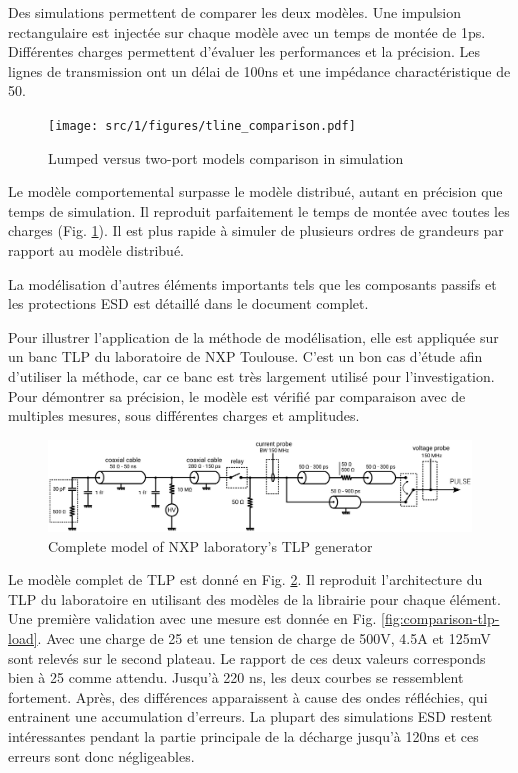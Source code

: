 Des simulations permettent de comparer les deux modèles.
Une impulsion rectangulaire est injectée sur chaque modèle avec un temps de montée de 1ps.
Différentes charges permettent d'évaluer les performances et la précision.
Les lignes de transmission ont un délai de 100ns et une impédance charactéristique de 50\textOmega{}.

\begin{figure}[!h]
  \centering
  \texttt{[image: src/1/figures/tline\_comparison.pdf]}
  \caption{Lumped versus two-port models comparison in simulation}
  \label{fig:lines-simulations}
\end{figure}

Le modèle comportemental surpasse le modèle distribué, autant en précision que temps de simulation.
Il reproduit parfaitement le temps de montée avec toutes les charges (Fig. \ref{fig:lines-simulations}).
Il est plus rapide à simuler de plusieurs ordres de grandeurs par rapport au modèle distribué.

La modélisation d'autres éléments importants tels que les composants passifs et les protections ESD est détaillé dans le document complet.

Pour illustrer l'application de la méthode de modélisation, elle est appliquée sur un banc TLP du laboratoire de NXP Toulouse.
C'est un bon cas d'étude afin d'utiliser la méthode, car ce banc est très largement utilisé pour l'investigation.
Pour démontrer sa précision, le modèle est vérifié par comparaison avec de multiples mesures, sous différentes charges et amplitudes.

\begin{figure}[!h]
  \centering
  \includegraphics[width=\textwidth]{src/1/figures/complete_nxp_tlp_model.pdf}
  \caption{Complete model of NXP laboratory's TLP generator}
  \label{fig:complete-tlp-model}
\end{figure}

Le modèle complet de TLP est donné en Fig. \ref{fig:complete-tlp-model}.
Il reproduit l'architecture du TLP du laboratoire en utilisant des modèles de la librairie pour chaque élément.
Une première validation avec une mesure est donnée en Fig. \ref{fig:comparison-tlp-load}.
Avec une charge de 25\textOmega{} et une tension de charge de 500V, 4.5A et 125mV sont relevés sur le second plateau.
Le rapport de ces deux valeurs corresponds bien à 25\textOmega{} comme attendu.
Jusqu'à 220 ns, les deux courbes se ressemblent fortement.
Après, des différences apparaissent à cause des ondes réfléchies, qui entrainent une accumulation d'erreurs.
La plupart des simulations ESD restent intéressantes pendant la partie principale de la décharge jusqu'à 120ns et ces erreurs sont donc négligeables.

